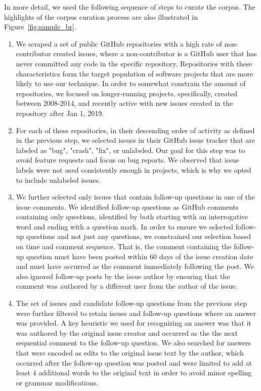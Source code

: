 In more detail, we used the following sequence of steps to curate the corpus. The highlights of the corpus curation process are also illustrated in Figure~\ref{fig:sample_br}.
\begin{enumerate}
\item We scraped a set of public GitHub repositories with a high rate of
non-contributor created issues, where a non-contributor is a GitHub user that has never
committed any code in the specific repository. Repositories with these characteristics form
the target population of software projects that are more likely to use our technique. In order
to somewhat constrain  the amount of repositories, we focused on longer-running projects,
specifically, created between 2008-2014, and recently active with new issues created in the repository after Jan 1, 2019.
\item For each of these repositories, in their descending order of activity as defined in the previous step,
we selected issues in their GitHub issue tracker that are labeled as "bug", "crash", "fix", or unlabeled. Our goal for this step was
to avoid feature requests and focus on bug reports. We observed that issue labels were not used consistently enough
in projects, which is why we opted to include unlabeled issues.
\item We further selected only issues that contain follow-up questions in one of the issue comments.  We identified follow-up questions as GitHub comments containing only questions, identified by both starting with an interrogative word and ending with a question mark. In order to ensure we selected follow-up questions and not just
any questions, we constrained our selection based on time and comment sequence. That is, the comment containing the follow-up question must have been posted within 60 days of the issue creation date and must have occurred as the comment immediately following the post. We also ignored follow-up posts by the issue author by ensuring that the comment was authored by a different user from the author of the issue.
\item The set of issues and candidate follow-up questions from the previous step were further filtered to
retain issues and follow-up questions where an answer was provided. A key heuristic we used for recognizing an answer was that it was authored
by the original issue creator and occurred as the the next sequential comment
to the follow-up question. We also searched for answers that were encoded as edits to the original issue text by the author, which occurred after the follow-up question was posted and were limited to add at least 4 additional words to the original text in order to avoid minor spelling or grammar modifications.
\end{enumerate}

